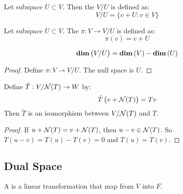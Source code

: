 \begin{definition}
    Let subspace $U \subset V$. Then the  $V/U$ is defined as:
    \begin{equation}
        V/U = \{ v + U: v \in V \}
    \end{equation}
\end{definition}

\begin{definition}
    Let subspace $U \subset V$. The  $\pi: V \rightarrow V/U$ is defined as:
    \begin{equation}
        \pi(v) = v + U
    \end{equation}
\end{definition}

\begin{theorem}
    \begin{equation}
        \displaystyle \mathbf{dim}\left( V/U \right) = \displaystyle \mathbf{dim}\left( V \right) - \displaystyle \mathbf{dim}\left( U \right)
    \end{equation}
\end{theorem}

\begin{proof}
    Define $\pi : V \rightarrow V/U$. The null space is $U$.
\end{proof}

\begin{theorem}
    Define $\tilde{T}: V/\mathcal{N}(T) \rightarrow W$ by:
    \begin{equation*}
        \tilde{T}\left(v + \mathcal{N}(T) \right) = Tv
    \end{equation*}
    Then $\tilde{T}$ is an isomorphism between $V/\mathcal{N}(T)$ and $T$.
\end{theorem}
\begin{proof}
    If $u + \mathcal{N}(T) = v + \mathcal{N}(T)$, then $u - v \in \mathcal{N}(T)$. So $T(u - v) = T(u) - T(v) = 0$ and $T(u) = T(v)$.
\end{proof}



\subsection{Dual Space}


\begin{definition}
	A  is a linear transformation that map from $V$ into $F$.
\end{definition}

